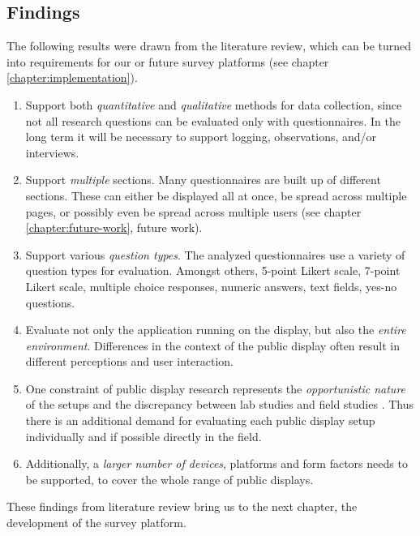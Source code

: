 \subsection{Findings}
\label{section:questionnaires:findings}

	The following results were drawn from the literature review, which can be turned into requirements for our or future survey platforms (see chapter \ref{chapter:implementation}).


	\begin{enumerate}
		\item Support both \textit{quantitative} and \textit{qualitative} methods for data collection, since not all research questions can be evaluated only with questionnaires. In the long term it will be necessary to support logging, observations, and/or interviews.

		\item Support \textit{multiple} sections. Many questionnaires are built up of different sections. These can either be displayed all at once, be spread across multiple pages, or possibly even be spread across multiple users (see chapter \ref{chapter:future-work}, future work).

		\item Support various \textit{question types}. The analyzed questionnaires use a variety of question types for evaluation. Amongst others, 5-point Likert scale, 7-point Likert scale, multiple choice responses, numeric answers, text fields, yes-no questions.

		\item Evaluate not only the application running on the display, but also the \textit{entire environment}. Differences in the context of the public display often result in different perceptions and user interaction.

		\item One constraint of public display research represents the \textit{opportunistic nature} of the setups and the discrepancy between lab studies and field studies \cite{Ojala2011}. Thus there is an additional demand for evaluating each public display setup individually and if possible directly in the field.

		\item Additionally, a \textit{larger number of devices}, platforms and form factors needs to be supported, to cover the whole range of public displays.
	\end{enumerate}


	These findings from literature review bring us to the next chapter, the development of the survey platform.

